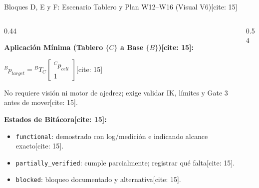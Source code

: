 \documentclass[aspectratio=169, xcolor={table,xcdraw}]{beamer}
\begin{document}
\begin{frame}{Bloques D, E y F: Escenario Tablero y Plan W12–W16 (Visual V6)[cite: 15]}
    \begin{columns}[T]
        \begin{column}{0.44\textwidth}
            \scriptsize\raggedright
            \textbf{Aplicación Mínima (Tablero $\{C\}$ a Base $\{B\}$)[cite: 15]:}
            \begin{center}
                $\boxed{ {}^Bp_{target} = {}^BT_C \begin{bmatrix} {}^Cp_{cell} \\ 1 \end{bmatrix} }$[cite: 15]
            \end{center}
            No requiere visión ni motor de ajedrez; exige validar IK, límites y Gate 3 antes de mover[cite: 15].
            \vspace{0.1cm}
            \par\textbf{Estados de Bitácora[cite: 15]:}
            \begin{itemize}\setlength{\itemsep}{1pt}
                \item \texttt{functional}: demostrado con log/medición e indicando alcance exacto[cite: 15].
                \item \texttt{partially\_verified}: cumple parcialmente; registrar qué falta[cite: 15].
                \item \texttt{blocked}: bloqueo documentado y alternativa[cite: 15].
            \end{itemize}
        \end{column}
        \begin{column}{0.54\textwidth}
            \centering
\end{column}
\end{columns}
\end{frame}
\end{document}
